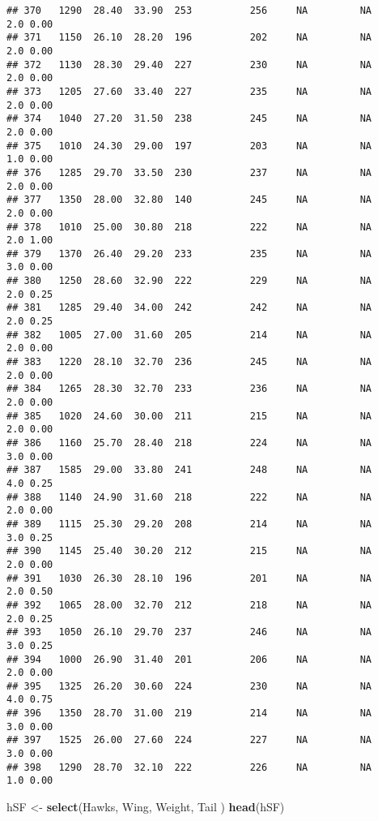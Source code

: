 \documentclass[
]{article}
\newenvironment{Shaded}{\begin{snugshade}}{\end{snugshade}}
\newcommand{\FunctionTok}[1]{\textcolor[rgb]{0.13,0.29,0.53}{\textbf{#1}}}
\newcommand{\NormalTok}[1]{#1}
\newcommand{\OtherTok}[1]{\textcolor[rgb]{0.56,0.35,0.01}{#1}}
\begin{document}
\begin{verbatim}
## 370   1290  28.40  33.90  253          256     NA         NA     2.0 0.00
## 371   1150  26.10  28.20  196          202     NA         NA     2.0 0.00
## 372   1130  28.30  29.40  227          230     NA         NA     2.0 0.00
## 373   1205  27.60  33.40  227          235     NA         NA     2.0 0.00
## 374   1040  27.20  31.50  238          245     NA         NA     2.0 0.00
## 375   1010  24.30  29.00  197          203     NA         NA     1.0 0.00
## 376   1285  29.70  33.50  230          237     NA         NA     2.0 0.00
## 377   1350  28.00  32.80  140          245     NA         NA     2.0 0.00
## 378   1010  25.00  30.80  218          222     NA         NA     2.0 1.00
## 379   1370  26.40  29.20  233          235     NA         NA     3.0 0.00
## 380   1250  28.60  32.90  222          229     NA         NA     2.0 0.25
## 381   1285  29.40  34.00  242          242     NA         NA     2.0 0.25
## 382   1005  27.00  31.60  205          214     NA         NA     2.0 0.00
## 383   1220  28.10  32.70  236          245     NA         NA     2.0 0.00
## 384   1265  28.30  32.70  233          236     NA         NA     2.0 0.00
## 385   1020  24.60  30.00  211          215     NA         NA     2.0 0.00
## 386   1160  25.70  28.40  218          224     NA         NA     3.0 0.00
## 387   1585  29.00  33.80  241          248     NA         NA     4.0 0.25
## 388   1140  24.90  31.60  218          222     NA         NA     2.0 0.00
## 389   1115  25.30  29.20  208          214     NA         NA     3.0 0.25
## 390   1145  25.40  30.20  212          215     NA         NA     2.0 0.00
## 391   1030  26.30  28.10  196          201     NA         NA     2.0 0.50
## 392   1065  28.00  32.70  212          218     NA         NA     2.0 0.25
## 393   1050  26.10  29.70  237          246     NA         NA     3.0 0.25
## 394   1000  26.90  31.40  201          206     NA         NA     2.0 0.00
## 395   1325  26.20  30.60  224          230     NA         NA     4.0 0.75
## 396   1350  28.70  31.00  219          214     NA         NA     3.0 0.00
## 397   1525  26.00  27.60  224          227     NA         NA     3.0 0.00
## 398   1290  28.70  32.10  222          226     NA         NA     1.0 0.00
\end{verbatim}

\begin{Shaded}
\begin{Highlighting}[]
\NormalTok{hSF }\OtherTok{\textless{}{-}} \FunctionTok{select}\NormalTok{(Hawks, Wing, Weight, Tail )}
\FunctionTok{head}\NormalTok{(hSF)}
\end{Highlighting}
\end{Shaded}
\end{document}
